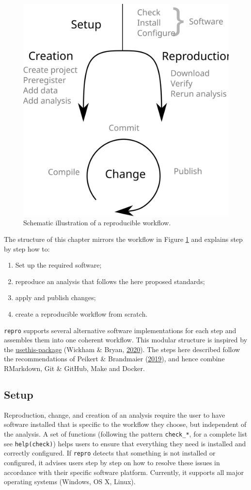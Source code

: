 \documentclass[12pt,a4paper,]{article}
\providecommand{\tightlist}{%
  \setlength{\itemsep}{0pt}\setlength{\parskip}{0pt}}
\begin{document}
\begin{figure}

{\centering \includegraphics[width=0.5\linewidth]{images/idealized-workflow} 

}

\caption{Schematic illustration of a reproducible workflow.  }\label{fig:workflow}
\end{figure}

The structure of this chapter mirrors the workflow in Figure \ref{fig:workflow} and explains step by step how to:

\begin{enumerate}
\def\labelenumi{\arabic{enumi}.}
\tightlist
\item
  Set up the required software;
\item
  reproduce an analysis that follows the here proposed standards;
\item
  apply and publish changes;
\item
  create a reproducible workflow from scratch.
\end{enumerate}

\texttt{repro} supports several alternative software implementations for each step and assembles them into one coherent workflow.
This modular structure is inspired by the \href{https://usethis.r-lib.org}{usethis-package} (Wickham \& Bryan, \protect\hyperlink{ref-R-usethis}{2020}).
The steps here described follow the recommendations of Peikert \& Brandmaier (\protect\hyperlink{ref-peikertReproducibleDataAnalysis2019}{2019}), and hence combine RMarkdown, Git \& GitHub, Make and Docker.

\hypertarget{setup}{%
\subsection{Setup}\label{setup}}

Reproduction, change, and creation of an analysis require the user to have software installed that is specific to the workflow they choose, but independent of the analysis.
A set of functions (following the pattern \texttt{check\_*}, for a complete list see \texttt{help(check)}) helps users to ensure that everything they need is installed and correctly configured.
If \texttt{repro} detects that something is not installed or configured, it advises users step by step on how to resolve these issues in accordance with their specific software platform.
Currently, it supports all major operating systems (Windows, OS X, Linux).
\end{document}
